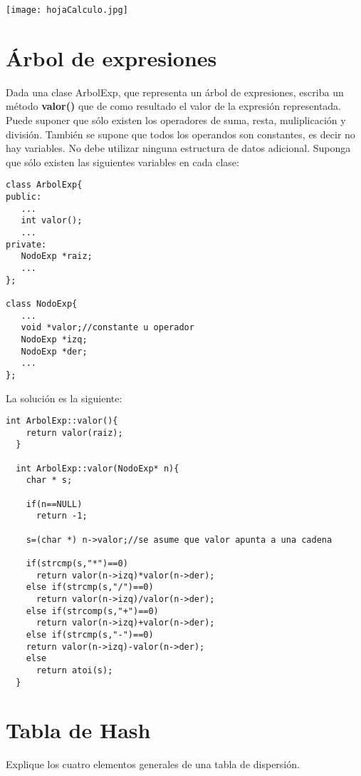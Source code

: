 \begin{center}
  \texttt{[image: hojaCalculo.jpg]}
\end{center}

\section{Árbol de expresiones}
\label{sec:arbol-de-expresiones}

Dada una clase ArbolExp, que representa un árbol de expresiones,
escriba un método \textbf{valor()} que de como resultado el valor de
la expresión representada. Puede suponer que sólo existen los
operadores de suma, resta, muliplicación y división. También se supone
que todos los operandos son constantes, es decir no hay variables. No
debe utilizar ninguna estructura de datos adicional. Suponga que sólo
existen las siguientes variables en cada clase:
\begin{lstlisting}[style=miEstilo, numbers=none]
class ArbolExp{
public:
   ...
   int valor();
   ...
private:
   NodoExp *raiz;
   ...
};

class NodoExp{
   ...
   void *valor;//constante u operador
   NodoExp *izq;
   NodoExp *der;
   ...
};
\end{lstlisting}

La solución es la siguiente:
\begin{lstlisting}[style=miEstilo, numbers=none]
  int ArbolExp::valor(){
    return valor(raiz);
  }

  int ArbolExp::valor(NodoExp* n){
    char * s;

    if(n==NULL)
      return -1;

    s=(char *) n->valor;//se asume que valor apunta a una cadena

    if(strcmp(s,"*")==0)
      return valor(n->izq)*valor(n->der);
    else if(strcmp(s,"/")==0)
      return valor(n->izq)/valor(n->der);
    else if(strcomp(s,"+")==0)
      return valor(n->izq)+valor(n->der);
    else if(strcmp(s,"-")==0)
	return valor(n->izq)-valor(n->der);
    else
      return atoi(s);
  }
\end{lstlisting}


\section{Tabla de Hash}
\label{sec:tabla-de-hash}

Explique los cuatro elementos generales de una tabla de dispersión.

